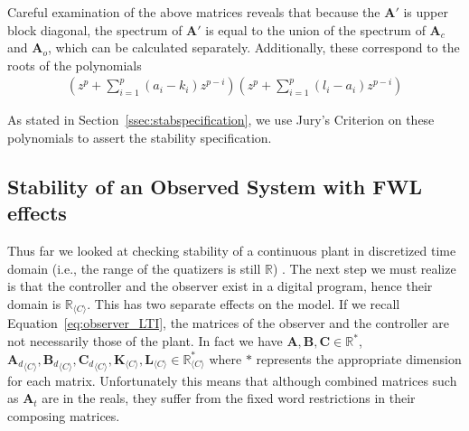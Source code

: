 \documentclass[sigconf]{llncs}
\newcommand{\mat}[1]{\boldsymbol{#1}}
\begin{document}
Careful examination of the above matrices reveals that because the $\mat{A}'$ is
upper block diagonal, the spectrum of $\mat{A}'$ is equal to the union of
the spectrum of $\mat{A}_{c}$ and $\mat{A}_{o}$, which can be calculated
separately.  Additionally, these correspond to the roots of the polynomials
%
\begin{align*}
\left(z^p+\sum_{i=1}^p{(a_i-k_i)z^{p-i}}\right) \left(z^p+\sum_{i=1}^p{(l_i-a_i)z^{p-i}}\right)
\end{align*}

As stated in Section~\ref{ssec:stabspecification}, we use Jury's Criterion on these polynomials
to assert the stability specification.

\subsection{Stability of an Observed System with FWL effects}\label{sec:cof_fwl_stability}

Thus far we looked at checking stability
of a continuous plant in discretized time domain (i.e., the range of the quatizers is still
$\mathbb{R}$) .  The next step we must realize is that the controller and the
observer exist in a digital program, hence their domain is
$\mathbb{R}_{\langle C \rangle}$.  This has two separate effects on the
model.  If we recall Equation~\eqref{eq:observer_LTI}, the matrices of the observer
and the controller are not necessarily those of the plant.  In fact we have
$\mat{A},\mat{B},\mat{C} \in \mathbb{R}^*$, ${\mat{A}_d}_{\langle C
\rangle},{\mat{B}_d}_{\langle C \rangle},{\mat{C}_d}_{\langle C \rangle},
\mat{K}_{\langle C \rangle}, \mat{L}_{\langle C \rangle} \in
\mathbb{R}_{\langle C \rangle}^*$ where $*$ represents the appropriate
dimension for each matrix.  Unfortunately this means that although combined
matrices such as $\mat{A}_t$ are in the reals, they suffer from the fixed
word restrictions in their composing matrices.
\end{document}
